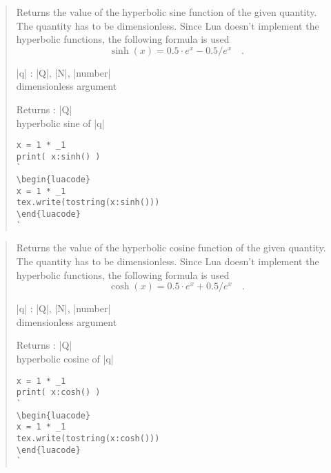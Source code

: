 \documentclass{ltxdoc}
\begin{document}
\begin{quote}
  Returns the value of the hyperbolic sine function of the given quantity. The quantity has to be dimensionless. Since Lua doesn't implement the hyperbolic functions, the following formula is used 
  $$
    \sinh(x) = 0.5 \cdot e^x - 0.5 / e^x  \quad.
  $$

  \begin{description}
  \item |q| : |Q|, |N|, |number|\\
    dimensionless argument

  \item Returns : |Q|\\
    hyperbolic sine of |q|
  \end{description}


\begin{lstlisting}
x = 1 * _1
print( x:sinh() )
`
\begin{luacode}
x = 1 * _1
tex.write(tostring(x:sinh()))
\end{luacode}
`
\end{lstlisting}

\end{quote}



\begin{quote}
  Returns the value of the hyperbolic cosine function of the given quantity. The quantity has to be dimensionless. Since Lua doesn't implement the hyperbolic functions, the following formula is used 
  $$
    \cosh(x) = 0.5 \cdot e^x + 0.5 / e^x  \quad.
  $$

  \begin{description}
  \item |q| : |Q|, |N|, |number|\\
    dimensionless argument

  \item Returns : |Q|\\
    hyperbolic cosine of |q|
  \end{description}

\begin{lstlisting}
x = 1 * _1
print( x:cosh() )
`
\begin{luacode}
x = 1 * _1
tex.write(tostring(x:cosh()))
\end{luacode}
`
\end{lstlisting}

\end{quote}
\end{document}
